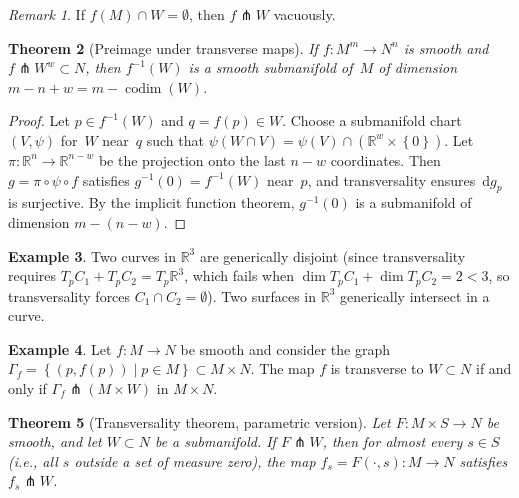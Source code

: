 \documentclass[12pt,a4paper,openany]{book}
\newtheorem{theorem}{Theorem}[section]
\theoremstyle{definition}
\newtheorem{example}[theorem]{Example}
\theoremstyle{remark}
\newtheorem{remark}[theorem]{Remark}
\newcommand{\R}{\mathbb{R}}
\newcommand{\dd}{\,\mathrm{d}}
\newcommand{\set}[1]{\left\{ #1 \right\}}
\begin{document}
\begin{remark}\label{rem:transverse-disjoint}
If $f(M)\cap W = \emptyset$, then $f\pitchfork W$ vacuously.
\end{remark}

\begin{theorem}[Preimage under transverse maps]\label{thm:transverse-preimage}
If $f\colon M^m\to N^n$ is smooth and $f\pitchfork W^w\subset N$,
then $f^{-1}(W)$ is a smooth submanifold of~$M$ of dimension
$m - n + w = m - \operatorname{codim}(W)$.
\end{theorem}

\begin{proof}
Let $p\in f^{-1}(W)$ and $q = f(p)\in W$.  Choose a submanifold chart
$(V,\psi)$ for~$W$ near~$q$ such that $\psi(W\cap V) = \psi(V)\cap(\R^w\times\set{0})$.
Let $\pi\colon\R^n\to\R^{n-w}$ be the projection onto the last $n-w$
coordinates.  Then $g = \pi\circ\psi\circ f$ satisfies $g^{-1}(0) = f^{-1}(W)$
near~$p$, and transversality ensures $\dd g_p$ is surjective.  By the
implicit function theorem, $g^{-1}(0)$ is a submanifold of dimension
$m - (n-w)$.
\end{proof}

\begin{example}\label{ex:transverse-curves}
Two curves in $\R^3$ are generically disjoint (since transversality
requires $T_pC_1 + T_pC_2 = T_p\R^3$, which fails when
$\dim T_pC_1 + \dim T_pC_2 = 2 < 3$, so transversality forces
$C_1\cap C_2 = \emptyset$).  Two surfaces in $\R^3$ generically
intersect in a curve.
\end{example}

\begin{example}\label{ex:transverse-diagonal}
Let $f\colon M\to N$ be smooth and consider the graph
$\Gamma_f = \set{(p,f(p))\mid p\in M}\subset M\times N$.
The map $f$ is transverse to $W\subset N$ if and only if
$\Gamma_f\pitchfork (M\times W)$ in $M\times N$.
\end{example}

\begin{theorem}[Transversality theorem, parametric version]
  \label{thm:transversality-parametric}
Let $F\colon M\times S\to N$ be smooth, and let $W\subset N$ be a
submanifold.  If $F\pitchfork W$, then for almost every $s\in S$
(i.e., all $s$ outside a set of measure zero), the map
$f_s = F(\cdot,s)\colon M\to N$ satisfies $f_s\pitchfork W$.
\end{theorem}
\end{document}
